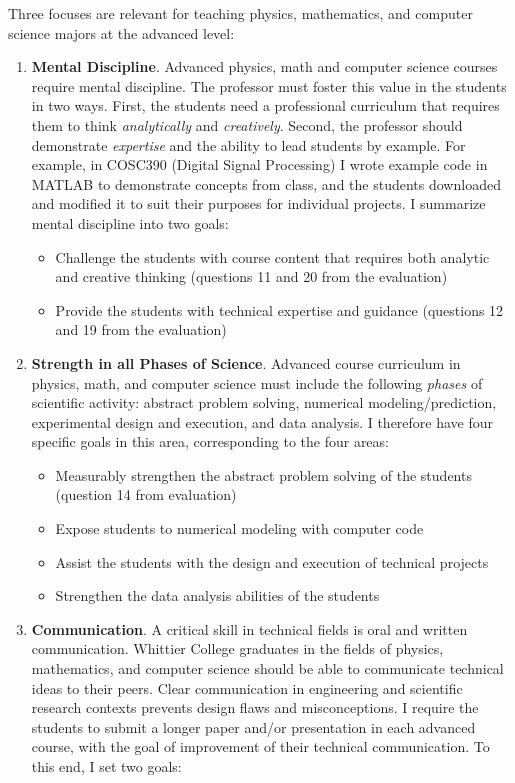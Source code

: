 \documentclass[../../main.tex]{subfiles}
\begin{document}
Three focuses are relevant for teaching physics, mathematics, and computer science majors at the advanced level:
\begin{enumerate}
\item \textbf{Mental Discipline}.  Advanced physics, math and computer science courses require mental discipline.  The professor must foster this value in the students in two ways.  First, the students need a professional curriculum that requires them to think \textit{analytically} and \textit{creatively}.  Second, the professor should demonstrate \textit{expertise} and the ability to lead students by example.  For example, in COSC390 (Digital Signal Processing) I wrote example code in MATLAB to demonstrate concepts from class, and the students downloaded and modified it to suit their purposes for individual projects.  I summarize mental discipline into two goals:

\begin{itemize}
\item Challenge the students with course content that requires both analytic and creative thinking (questions 11 and 20 from the evaluation)
\item Provide the students with technical expertise and guidance (questions 12 and 19 from the evaluation)
\end{itemize}

\item \textbf{Strength in all Phases of Science}. Advanced course curriculum in physics, math, and computer science must include the following \textit{phases} of scientific activity: abstract problem solving, numerical modeling/prediction, experimental design and execution, and data analysis. I therefore have four specific goals in this area, corresponding to the four areas:

\begin{itemize}
\item Measurably strengthen the abstract problem solving of the students (question 14 from evaluation)
\item Expose students to numerical modeling with computer code  %
\item Assist the students with the design and execution of technical projects %
\item Strengthen the data analysis abilities of the students %
\end{itemize}

\item \textbf{Communication}.  A critical skill in technical fields is oral and written communication.  Whittier College graduates in the fields of physics, mathematics, and computer science should be able to communicate technical ideas to their peers.  Clear communication in engineering and scientific research contexts prevents design flaws and misconceptions.  I require the students to submit a longer paper and/or presentation in each advanced course, with the goal of improvement of their technical communication.  To this end, I set two goals:


\end{enumerate}
\end{document}
